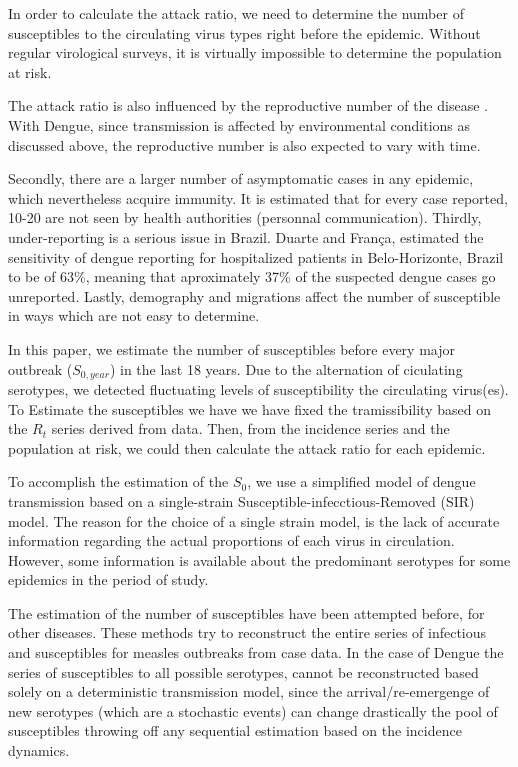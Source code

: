 In order to calculate the attack ratio, we need to determine the number of 
susceptibles to the circulating virus types right before the epidemic. Without 
regular virological surveys, it is virtually impossible to determine the 
population at risk.

The attack ratio is also influenced by the reproductive number of the disease 
\cite{bacaer_final_2009, katriel_attack_2012}. With Dengue, since transmission 
is affected by environmental conditions as discussed above, the reproductive 
number is also expected to vary with time. 



Secondly, there are a larger number of asymptomatic cases in 
any epidemic, which nevertheless acquire immunity. It is estimated that for 
every case reported, 10-20 are not seen by health authorities (personnal 
communication).
Thirdly, under-reporting is a serious issue in Brazil. 
Duarte and Fran\c{c}a\cite{duarte_data_2006}, estimated 
the sensitivity of dengue reporting for hospitalized patients in 
Belo-Horizonte, Brazil to be of 63\%, 
meaning that aproximately 37\% of the suspected dengue cases go unreported.  
Lastly, demography and migrations affect the number of susceptible in ways which 
are not easy to determine.


In this paper, we estimate the number of susceptibles before every major 
outbreak ($S_{0, year}$) in the last 18 years. Due to the alternation of 
ciculating serotypes, we detected fluctuating levels of susceptibility the 
circulating virus(es). To Estimate the susceptibles we have we have fixed the 
tramissibility based on the $R_t$ series derived from data\cite{nishiura}. Then, 
from the incidence series and the population at risk, we could then calculate 
the attack ratio for each epidemic.

To accomplish the estimation of the $S_0$, we use a simplified model of 
dengue transmission based on a single-strain Susceptible-infecctious-Removed 
(SIR) model. The reason for the choice of a single strain model, is the lack of 
accurate information regarding the actual proportions of each virus in 
circulation. However, some information is available about the predominant 
serotypes for some epidemics in the period 
of study\cite{macedo_virological_2013}. 

The estimation of the  number of susceptibles have been attempted 
before, for other diseases\cite{bjornstad_dynamics_2002, 
wallinga_reconstruction_2003}. These methods try to reconstruct the entire 
series of infectious and susceptibles for measles 
outbreaks from case data. In the case of Dengue the 
series of susceptibles to all possible serotypes, cannot be reconstructed based 
solely on a deterministic transmission model, since the arrival/re-emergenge of 
new serotypes (which are a stochastic events) can change drastically the pool 
of susceptibles throwing off any sequential estimation based on the incidence
dynamics.

